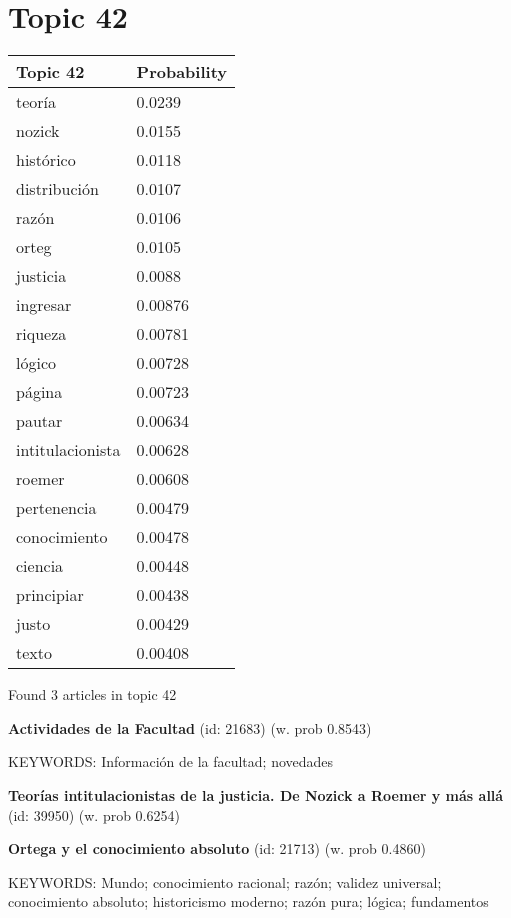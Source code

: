 \documentclass{article}
\begin{document}
\section*{Topic 42}\vfill
\begin{tabular}{ll}
\toprule
         Topic 42 & Probability \\
\midrule
           teoría &      0.0239 \\
           nozick &      0.0155 \\
        histórico &      0.0118 \\
     distribución &      0.0107 \\
            razón &      0.0106 \\
            orteg &      0.0105 \\
         justicia &      0.0088 \\
         ingresar &     0.00876 \\
          riqueza &     0.00781 \\
           lógico &     0.00728 \\
           página &     0.00723 \\
           pautar &     0.00634 \\
 intitulacionista &     0.00628 \\
           roemer &     0.00608 \\
      pertenencia &     0.00479 \\
     conocimiento &     0.00478 \\
          ciencia &     0.00448 \\
       principiar &     0.00438 \\
            justo &     0.00429 \\
            texto &     0.00408 \\
\bottomrule
\end{tabular}

\vfill
Found 3 articles in topic 42
\vfill

\textbf{Actividades de la Facultad} (id: 21683)
 (w. prob 0.8543)


KEYWORDS:
Información de la facultad; novedades
\vfill

\textbf{Teorías intitulacionistas de la justicia. De Nozick a Roemer y más allá} (id: 39950)
 (w. prob 0.6254)
\vfill

\textbf{Ortega y el conocimiento absoluto} (id: 21713)
 (w. prob 0.4860)


KEYWORDS:
Mundo; conocimiento racional; razón; validez universal; conocimiento absoluto; historicismo moderno; razón pura; lógica; fundamentos
\end{document}
